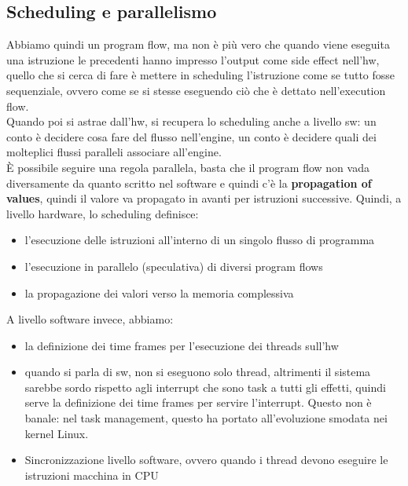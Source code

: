 \documentclass[14pt, oneside]{book}
\begin{document}
\subsection{Scheduling e parallelismo}
Abbiamo quindi un program flow, ma non è più vero che quando viene eseguita una istruzione le precedenti hanno impresso l'output come side effect nell'hw, quello che si cerca di fare è mettere in scheduling l'istruzione come se tutto fosse sequenziale, ovvero come se si stesse eseguendo ciò che è dettato nell'execution flow.\\ Quando poi si astrae dall'hw, si recupera lo scheduling anche a livello sw: un conto è decidere cosa fare del flusso nell'engine, un conto è decidere quali dei molteplici flussi paralleli associare all'engine.\\ È possibile seguire una regola parallela, basta che il program flow non vada diversamente da quanto scritto nel software e quindi c'è la \textbf{propagation of values}, quindi il valore va propagato in avanti per istruzioni successive. 
Quindi, a livello hardware, lo scheduling definisce:
\begin{itemize}
\item l'esecuzione delle istruzioni all'interno di un singolo flusso di programma
\item l'esecuzione in parallelo (speculativa) di diversi program flows
\item la propagazione dei valori verso la memoria complessiva
\end{itemize}
A livello software invece, abbiamo:
\begin{itemize}
\item la definizione dei time frames per l'esecuzione dei threads sull'hw
\item quando si parla di sw, non si eseguono solo thread, altrimenti il sistema sarebbe sordo rispetto agli interrupt che sono task a tutti gli effetti, quindi serve la definizione dei time frames per servire l'interrupt. Questo non è banale: nel task management, questo ha portato all'evoluzione smodata nei kernel Linux.
\item Sincronizzazione livello software, ovvero quando i thread devono eseguire le istruzioni macchina in CPU
\end{itemize}
\end{document}
